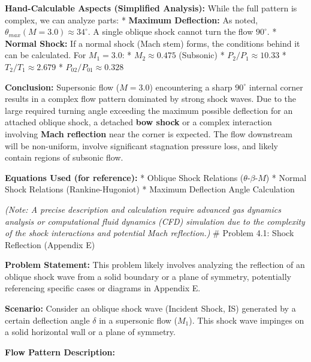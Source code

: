 \textbf{Hand-Calculable Aspects (Simplified Analysis):} While the full
pattern is complex, we can analyze parts: * \textbf{Maximum Deflection:}
As noted, \(\theta_{max}(M=3.0) \approx 34^\circ\). A single oblique
shock cannot turn the flow \(90^\circ\). * \textbf{Normal Shock:} If a
normal shock (Mach stem) forms, the conditions behind it can be
calculated. For \(M_1=3.0\): * \(M_2 \approx 0.475\) (Subsonic) *
\(P_2/P_1 \approx 10.33\) * \(T_2/T_1 \approx 2.679\) *
\(P_{02}/P_{01} \approx 0.328\)

\textbf{Conclusion:} Supersonic flow (\(M=3.0\)) encountering a sharp
\(90^\circ\) internal corner results in a complex flow pattern dominated
by strong shock waves. Due to the large required turning angle exceeding
the maximum possible deflection for an attached oblique shock, a
detached \textbf{bow shock} or a complex interaction involving
\textbf{Mach reflection} near the corner is expected. The flow
downstream will be non-uniform, involve significant stagnation pressure
loss, and likely contain regions of subsonic flow.

\textbf{Equations Used (for reference):} * Oblique Shock Relations
(\(\theta\)-\(\beta\)-\(M\)) * Normal Shock Relations (Rankine-Hugoniot)
* Maximum Deflection Angle Calculation

\emph{(Note: A precise description and calculation require advanced gas
dynamics analysis or computational fluid dynamics (CFD) simulation due
to the complexity of the shock interactions and potential Mach
reflection.)} \# Problem 4.1: Shock Reflection (Appendix E)

\textbf{Problem Statement:} This problem likely involves analyzing the
reflection of an oblique shock wave from a solid boundary or a plane of
symmetry, potentially referencing specific cases or diagrams in Appendix
E.

\textbf{Scenario:} Consider an oblique shock wave (Incident Shock, IS)
generated by a certain deflection angle \(\delta\) in a supersonic flow
(\(M_1\)). This shock wave impinges on a solid horizontal wall or a
plane of symmetry.

\textbf{Flow Pattern Description:}


